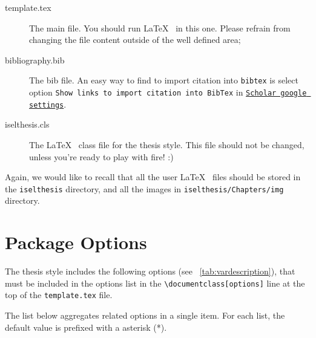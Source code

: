 \begin{description}
\begin{description}
		\item[template.tex] The main file. You should run  \LaTeX~ in this one. Please refrain from changing the file content outside of the well defined area;
		\item[bibliography.bib] The bib file. An easy way to find to import citation into \texttt{bibtex} is select option \texttt{Show links to import citation into
Bib\-Tex} in \href{http://scholar.google.pt/scholar_settings?hl=en&as_sdt=0,5}{\texttt{Scholar google settings}}.
		\item[iselthesis.cls] The  \LaTeX~ class file for the thesis{} style. {\color{red}This file should not be changed}, unless you're ready to play with fire! :)
	\end{description}
\end{description}

Again, we would like to recall that all the user \LaTeX~ files should be stored in the \verb!iselthesis! directory, and all the images in \verb!iselthesis/Chapters/img! directory.

\section{Package Options} %
\label{sec:package_options}

The thesis style includes the following options (see \tablename~\ref{tab:vardescription}), that must be included in the options list in the \verb|\documentclass[options]| line at the top of the \texttt{template.tex} file.

The list below aggregates related options in a single item. For each list, the default value is prefixed with a asterisk (*).

